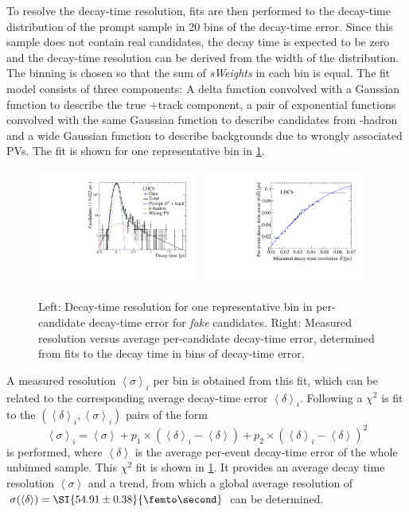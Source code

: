 To resolve the decay-time resolution, fits are then performed to the decay-time distribution of the prompt sample in \num{20} bins of the decay-time error.
Since this sample does not contain real \Bz candidates, the decay time is expected to be zero and the decay-time resolution can be derived from the width of the distribution.
The binning is chosen so that the sum of \emph{sWeights} in each bin is equal.
The fit model consists of three components: A delta function convolved with a Gaussian function to describe the true \Dpm+track component, a pair of exponential functions convolved with the same Gaussian function to describe candidates from \bquark-hadron and a wide Gaussian function to describe backgrounds due to wrongly associated \ac{PV}s.
The fit is shown for one representative bin in \cref{fig:resolutionRepresentativeBin}.
\begin{figure}[tbp]
    \centering
    \includegraphics[width=0.48\textwidth]{09TimeFit/figs/resolution_Bin15.pdf}
    \includegraphics[width=0.48\textwidth]{09TimeFit/figs/resolution_chi2Fit.pdf}
    \caption{Left: Decay-time resolution for one representative bin in per-candidate decay-time error for \emph{fake} \Bz candidates.
    Right: Measured resolution versus average per-candidate decay-time error, determined from fits to the decay time in bins of decay-time error.}
    \label{fig:resolutionRepresentativeBin}
\end{figure}
A measured resolution $\left<\sigma\right>_i$ per bin is obtained from this fit, which can be related to the corresponding average decay-time error $\left<\delta\right>_i$.
Following a $\chi^2$ is fit to the $(\left<\delta\right>_i, \left<\sigma\right>_i)$ pairs of the form
\begin{equation}
\left<\sigma\right>_i=\left<\sigma\right>+p_1\times\left(\left<\delta\right>_i-\left<\delta\right>\right)+p_2\times\left(\left<\delta\right>_i-\left<\delta\right>\right)^2
\end{equation}
is performed, where $\left<\delta\right>$ is the average per-event decay-time error of the whole unbinned sample.
This $\chi^2$ fit is shown in \cref{fig:resolutionRepresentativeBin}.
It provides an average decay time resolution $\left<\sigma\right>$ and a trend, from which a global average resolution of \mbox{$\sigma\!\left(\left<\delta\right>\right)=\SI{54.91\pm0.38}{\femto\second}$} can be determined.

